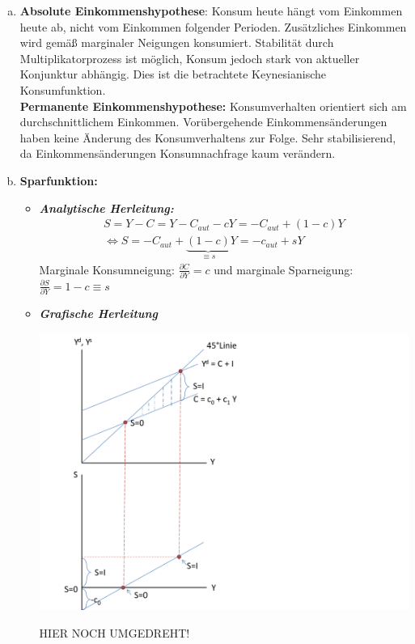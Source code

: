 \documentclass{scrartcl}
\begin{document}
\begin{enumerate}[(a)]
\item \textbf{Absolute Einkommenshypothese}: Konsum heute h\"{a}ngt vom Einkommen heute ab, nicht vom Einkommen folgender Perioden. Zus\"{a}tzliches Einkommen wird gem\"{a}{\ss} marginaler Neigungen konsumiert. Stabilit\"{a}t durch Multiplikatorprozess ist m\"{o}glich, Konsum jedoch stark von aktueller Konjunktur abh\"{a}ngig. Dies ist die betrachtete Keynesianische Konsumfunktion.\\
    \textbf{Permanente Einkommenshypothese:} Konsumverhalten orientiert sich am durchschnittlichem Einkommen. Vor\"{u}bergehende Einkommens\"{a}nderungen haben keine \"{A}nderung des Konsumverhaltens zur Folge. Sehr stabilisierend, da Einkommens\"{a}nderungen Konsumnachfrage kaum ver\"{a}ndern.
\item \textbf{Sparfunktion:}
\begin{itemize}
\item \textbf{\emph{Analytische Herleitung:}}
    \begin{align*}
      S=Y-C=Y-C_{aut}-c Y = -C_{aut}+(1-c) Y\\
      \Leftrightarrow S = -C_{aut} + \underbrace{(1-c)}_{\equiv s} Y = -c_{aut} + s Y
    \end{align*}
    Marginale Konsumneigung: $\frac{\partial C}{\partial Y} = c$ und marginale Sparneigung: $\frac{\partial S}{\partial Y} = 1-c\equiv s$
\item \textbf{\emph{Grafische Herleitung}}
\begin{center}
  \includegraphics[width=.7\textwidth]{Bilder/Keynes_Sparfunktion.pdf}\\
\end{center}
HIER NOCH UMGEDREHT!
\end{itemize}


\end{enumerate}
\end{document}
